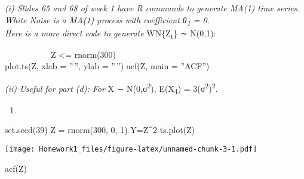 \documentclass[
]{article}
\newenvironment{Shaded}{\begin{snugshade}}{\end{snugshade}}
\newcommand{\DecValTok}[1]{\textcolor[rgb]{0.00,0.00,0.81}{#1}}
\newcommand{\FunctionTok}[1]{\textcolor[rgb]{0.00,0.00,0.00}{#1}}
\newcommand{\NormalTok}[1]{#1}
\newcommand{\OtherTok}[1]{\textcolor[rgb]{0.56,0.35,0.01}{#1}}
\newcommand{\SpecialCharTok}[1]{\textcolor[rgb]{0.00,0.00,0.00}{#1}}
\providecommand{\tightlist}{%
  \setlength{\itemsep}{0pt}\setlength{\parskip}{0pt}}
\begin{document}
\emph{(i) Slides 65 and 68 of week 1 have R commands to generate MA(1)
time series. White Noise is a MA(1) process with coefficient
θ\textsubscript{1} = 0.}\\
\emph{Here is a more direct code to generate} WN\{Z\textsubscript{t}\} ∼
N(0,1):

\setlength{\leftskip}{0cm}

\setlength{\leftskip}{2cm}

~~~~~~~~~~~Z \textless= rnorm(300)\\
\hspace*{0.333em}\hspace*{0.333em}\hspace*{0.333em}\hspace*{0.333em}\hspace*{0.333em}\hspace*{0.333em}\hspace*{0.333em}\hspace*{0.333em}\hspace*{0.333em}\hspace*{0.333em}\hspace*{0.333em}plot.ts(Z,
xlab = ''\,'', ylab = ''\,'') acf(Z, main = ''ACF'')

\emph{(ii) Useful for part (d): For} X ∼ N(0,σ\textsuperscript{2}),
E(X\textsubscript{4}) = 3(σ\textsuperscript{2})\textsuperscript{2}.

\setlength{\leftskip}{2cm}

\begin{enumerate}
\def\labelenumi{(\alph{enumi})}
\tightlist
\item
\end{enumerate}

\begin{Shaded}
\begin{Highlighting}[]
\FunctionTok{set.seed}\NormalTok{(}\DecValTok{39}\NormalTok{)}
\NormalTok{Z }\OtherTok{=} \FunctionTok{rnorm}\NormalTok{(}\DecValTok{300}\NormalTok{, }\DecValTok{0}\NormalTok{, }\DecValTok{1}\NormalTok{)}
\NormalTok{Y}\OtherTok{=}\NormalTok{Z}\SpecialCharTok{\^{}}\DecValTok{2}
\FunctionTok{ts.plot}\NormalTok{(Z)}
\end{Highlighting}
\end{Shaded}

\texttt{[image: Homework1\_files/figure-latex/unnamed-chunk-3-1.pdf]}

\begin{Shaded}
\begin{Highlighting}[]
\FunctionTok{acf}\NormalTok{(Z)}
\end{Highlighting}
\end{Shaded}
\end{document}
